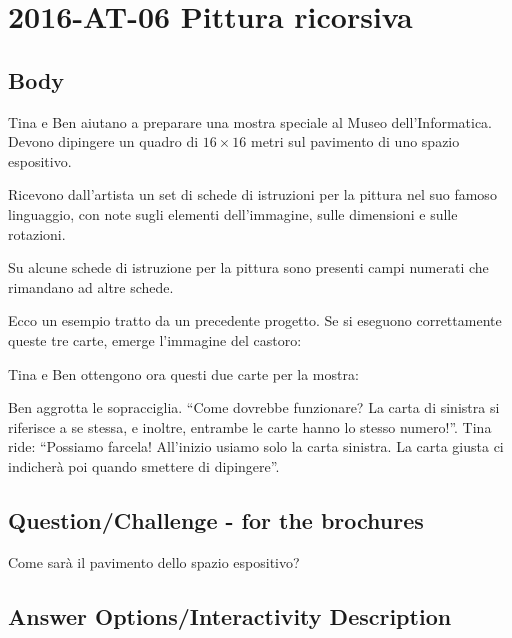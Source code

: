 \documentclass[a4paper,11pt]{report}
\newcommand{\taskGraphicsFolder}{..}
\begin{document}
\section*{\centering{} 2016-AT-06 Pittura ricorsiva}


\subsection*{Body}

Tina e Ben aiutano a preparare una mostra speciale al Museo dell’Informatica.
Devono dipingere un quadro di ${16 \times 16}$ metri sul pavimento di uno spazio espositivo.

Ricevono dall’artista un set di schede di istruzioni per la pittura nel suo famoso linguaggio,
con note sugli elementi dell’immagine, sulle dimensioni e sulle rotazioni.

Su alcune schede di istruzione per la pittura sono presenti campi numerati che rimandano ad altre schede.

Ecco un esempio tratto da un precedente progetto.
Se si eseguono correttamente queste tre carte, emerge l’immagine del castoro:

{\centering%
\par}

Tina e Ben ottengono ora questi due carte per la mostra:

{\centering%
\par}

Ben aggrotta le sopracciglia. \enquote{Come dovrebbe funzionare? La carta di sinistra si riferisce a se stessa,
e inoltre, entrambe le carte hanno lo stesso numero!}.
Tina ride: \enquote{Possiamo farcela! All’inizio usiamo solo la carta sinistra.
La carta giusta ci indicherà poi quando smettere di dipingere}.

{\em


\subsection*{Question/Challenge - for the brochures}

Come sarà il pavimento dello spazio espositivo?

}

\begingroup
\renewcommand{\arraystretch}{1.5}
\subsection*{Answer Options/Interactivity Description}
\end{document}
